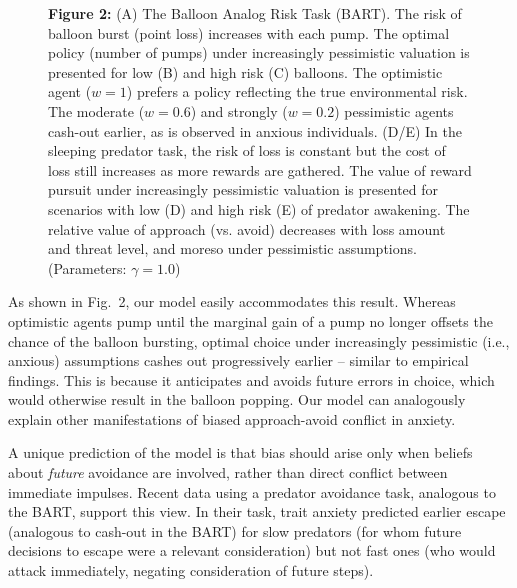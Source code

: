 \documentclass[11pt]{article} %
\begin{document}
\begin{figure}
  \centerline{%
  }
  \par \textbf{Figure 2:} (A) The Balloon Analog Risk Task (BART)\citep{Lejuez2002,Maner2007, ramirez2015}. The risk of balloon burst (point loss) increases with each pump. The optimal policy (number of pumps) under increasingly pessimistic valuation is presented for low (B) and high risk (C) balloons. The optimistic agent ($w=1$) prefers a policy reflecting the true environmental risk. The moderate ($w=0.6$) and strongly ($w=0.2$) pessimistic agents cash-out earlier, as is observed in anxious individuals. (D/E) In the sleeping predator task, the risk of loss is constant but the cost of loss still increases as more rewards are gathered. The value of reward pursuit under increasingly pessimistic valuation is presented for scenarios with low (D) and high risk (E)  of predator awakening. The relative value of approach (vs. avoid) decreases with loss amount and threat level, and moreso under pessimistic assumptions. (Parameters: $\gamma = 1.0$)
\end{figure}

As shown in Fig.~2, our model easily accommodates this result. Whereas optimistic agents pump until the marginal gain of a pump no longer offsets the chance of the balloon bursting, optimal choice under increasingly pessimistic (i.e., anxious) assumptions cashes out progressively earlier -- similar to empirical findings\citep{Maner2007, ramirez2015}. This is because it anticipates and avoids future errors in choice, which would otherwise result in the balloon popping. Our model can analogously explain other manifestations of biased approach-avoid conflict in anxiety\cite{fung2019}. 

A unique prediction of the model is that bias should arise only when beliefs about \emph{future} avoidance are involved, rather than direct conflict between immediate impulses. Recent data \cite{fung2019} using a predator avoidance task, analogous to the BART, support this view. In their task, trait anxiety predicted earlier escape (analogous to cash-out in the BART) for slow predators (for whom future decisions to escape were a relevant consideration) but not fast ones (who would attack immediately, negating consideration of future steps). 
\end{document}
